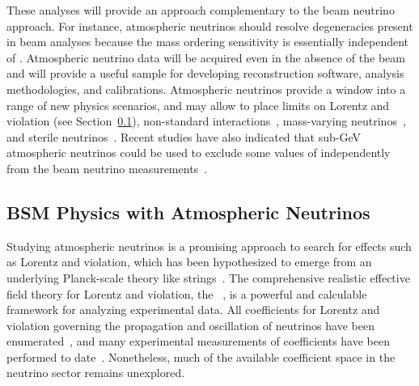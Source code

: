 These analyses will provide an approach complementary to the beam neutrino approach. For instance, atmospheric neutrinos should resolve  degeneracies present in beam analyses because the mass ordering sensitivity is essentially independent of \deltacp. Atmospheric neutrino data will be acquired 
even in the absence of the beam and will provide a useful sample for developing reconstruction software, analysis methodologies, and calibrations.  Atmospheric neutrinos provide a window into a range of new physics scenarios, and may allow  to place limits on Lorentz and  violation (see Section~\ref{sec:nonaccel-atm-bsm}), 
non-standard interactions~\cite{Chatterjee:2014gxa}, mass-varying neutrinos~\cite{Abe:2008zza}, and
sterile neutrinos~\cite{Abe:2014gda}.
Recent studies have also indicated that sub-GeV atmospheric neutrinos could be used to exclude some values of \deltacp independently from the beam neutrino measurements~\cite{Kelly:2019itm}.

\subsection{BSM Physics with Atmospheric Neutrinos}
\label{sec:nonaccel-atm-bsm}

Studying  atmospheric neutrinos is a promising approach
to search for  effects such as Lorentz and  violation,
which has been hypothesized
to emerge from an underlying Planck-scale theory like strings~\cite{Kostelecky:1988zi,Kostelecky:1991ak}.
The comprehensive realistic effective field theory
for Lorentz and  violation,
the ~\cite{Kostelecky:1994rn,Colladay:1996iz,Colladay:1998fq,Kostelecky:2003fs},
is a powerful and calculable framework
for analyzing experimental data.
All  coefficients for Lorentz and  violation
governing the propagation and oscillation of neutrinos
have been enumerated~\cite{Kostelecky:2003cr,Kostelecky:2011gq},
and many experimental measurements of  coefficients 
have been performed to date~\cite{Kostelecky:2008ts}.
Nonetheless,
much of the available  coefficient space 
in the neutrino sector remains unexplored.

